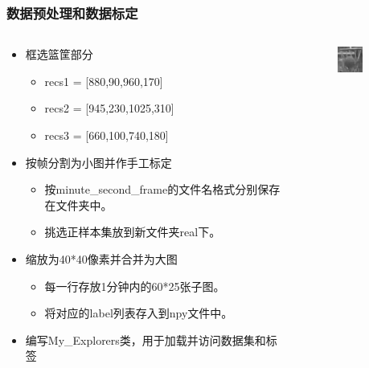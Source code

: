 \documentclass[notheorems, aspectratio=54]{beamer}
\begin{document}
\begin{frame}
\frametitle{数据预处理和数据标定}
\begin{columns}
\begin{column}{.7\linewidth}
\begin{itemize}
	\item 框选篮筐部分
	\begin{itemize}
		\item recs1 = [880,90,960,170]
		\item recs2 = [945,230,1025,310]
		\item recs3 = [660,100,740,180]
	\end{itemize}
	\item 按帧分割为小图并作手工标定
	\begin{itemize}
		\item 按minute\_second\_frame的文件名格式分别保存在文件夹中。
		\item 挑选正样本集放到新文件夹real下。
	\end{itemize}
	\item 缩放为40*40像素并合并为大图
	\begin{itemize}
		\item 每一行存放1分钟内的60*25张子图。
		\item 将对应的label列表存入到npy文件中。
	\end{itemize}
	\item 编写My\_Explorers类，用于加载并访问数据集和标签
\end{itemize}
\end{column}
\begin{column}{.3\linewidth}
\begin{figure}[htbp]
	\centering
	\includegraphics[width=0.6\textwidth]{goal.jpg}
\end{figure}
\end{column}
\end{columns}
\end{frame}
\end{document}
